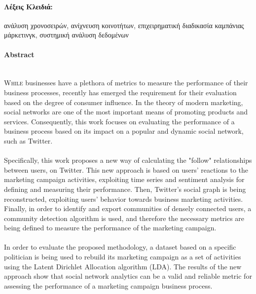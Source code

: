\documentclass[12pt,twoside]{article}
\newcommand{\en}{\selectlanguage{english}}
\newcommand{\gr}{\selectlanguage{greek}}
\begin{document}
\paragraph{\large{\gr Λέξεις Κλειδιά:}}
 ανάλυση χρονοσειρών, ανίχνευση κοινοτήτων, επιχειρηματική διαδικασία καμπάνιας μάρκετινγκ, συστημική ανάλυση δεδομένων


\newpage
\thispagestyle{empty}
\null


\newpage
\thispagestyle{plain}
\paragraph{\Large{\en Abstract}}
\
\\
\vspace{-0.7cm}
\en
\lettrine{W}{hile} businesses have a plethora of metrics to measure the performance of their business processes, recently has emerged the requirement for their evaluation based on the degree of consumer influence. In the theory of modern marketing, social networks are one of the most important means of promoting products and services. Consequently, this work focuses on evaluating the performance of a business process based on its impact on a popular and dynamic social network, such as Twitter.

\vspace{-6mm}
\paragraph{}
Specifically, this work proposes a new way of calculating the "follow" relationships between users, on Twitter. This new approach is based on users' reactions to the marketing campaign activities, exploiting time series and sentiment analysis for defining and measuring their performance. Then, Twitter's social graph is being reconstructed, exploiting users' behavior towards business marketing activities. Finally, in order to identify and export communities of densely connected users, a community detection algorithm is used, and therefore the necessary metrics are being defined to measure the performance of the marketing campaign.

\vspace{-6mm}
\paragraph{}
In order to evaluate the proposed methodology, a dataset based on a specific politician is being used to rebuild its marketing campaign as a set of activities using the Latent Dirichlet Allocation algorithm (LDA). The results of the new approach show that social network analytics can be a valid and reliable metric for assessing the performance of a marketing campaign business process.
\end{document}
